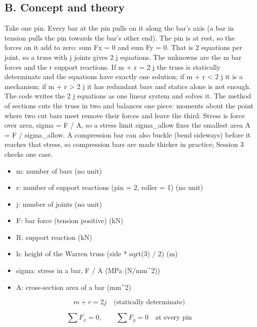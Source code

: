 \documentclass[11pt,a4paper]{article}
\begin{document}
\subsection*{B. Concept and theory}
Take one pin. Every bar at the pin pulls on it along the bar's axis (a bar in tension pulls the pin towards the bar's other end). The pin is at rest, so the forces on it add to zero: sum Fx = 0 and sum Fy = 0. That is 2 equations per joint, so a truss with j joints gives 2 j equations. The unknowns are the m bar forces and the r support reactions. If m + r = 2 j the truss is statically determinate and the equations have exactly one solution; if m + r \textless{} 2 j it is a mechanism; if m + r \textgreater{} 2 j it has redundant bars and statics alone is not enough. The code writes the 2 j equations as one linear system and solves it. The method of sections cuts the truss in two and balances one piece: moments about the point where two cut bars meet remove their forces and leave the third. Stress is force over area, sigma = F / A, so a stress limit sigma\_allow fixes the smallest area A = \textbar{}F\textbar{} / sigma\_allow. A compression bar can also buckle (bend sideways) before it reaches that stress, so compression bars are made thicker in practice; Session 3 checks one case.

\begin{itemize}[nosep]
\item m: number of bars (no unit)
\item r: number of support reactions (pin = 2, roller = 1) (no unit)
\item j: number of joints (no unit)
\item F: bar force (tension positive) (kN)
\item R: support reaction (kN)
\item h: height of the Warren truss (side * sqrt(3) / 2) (m)
\item sigma: stress in a bar, F / A (MPa (N/mm\textasciicircum{}2))
\item A: cross-section area of a bar (mm\textasciicircum{}2)
\end{itemize}

\begin{equation*}
m+r=2j\quad\text{(statically determinate)}
\end{equation*}

\begin{equation*}
\sum F_x=0,\qquad \sum F_y=0\quad\text{at every pin}
\end{equation*}
\end{document}
